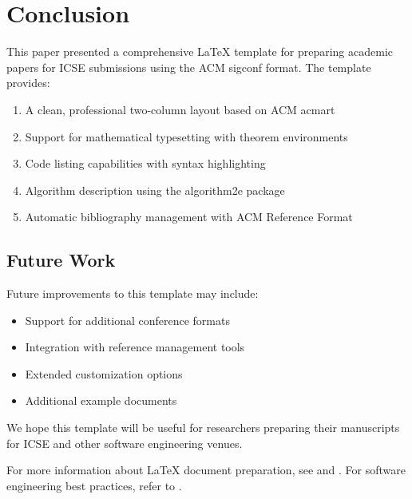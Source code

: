 
\section{Conclusion}
\label{sec:conclusion}

This paper presented a comprehensive LaTeX template for preparing
academic papers for ICSE submissions using the ACM sigconf format.
The template provides:

\begin{enumerate}
    \item A clean, professional two-column layout based on ACM acmart
    \item Support for mathematical typesetting with theorem environments
    \item Code listing capabilities with syntax highlighting
    \item Algorithm description using the algorithm2e package
    \item Automatic bibliography management with ACM Reference Format
\end{enumerate}

\subsection{Future Work}

Future improvements to this template may include:

\begin{itemize}
    \item Support for additional conference formats
    \item Integration with reference management tools
    \item Extended customization options
    \item Additional example documents
\end{itemize}

We hope this template will be useful for researchers preparing
their manuscripts for ICSE and other software engineering venues.

For more information about LaTeX document preparation,
see \cite{lamport1994latex} and \cite{knuth1984texbook}.
For software engineering best practices, refer to \cite{softwareeng}.
